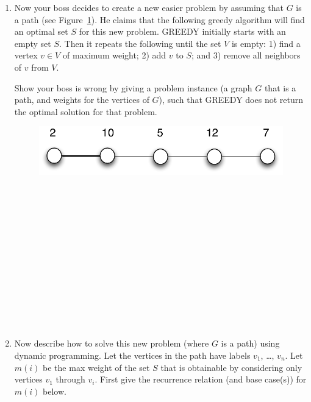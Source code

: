 \documentclass[11pt]{article}
\newcommand{\ans}[1]{}
\begin{document}
\begin{enumerate}
\begin{enumerate}
\pagebreak

\item Now your boss decides to create a new easier problem by assuming that $G$ is a path (see Figure~\ref{f:path}).  He claims that the following greedy algorithm will find an optimal set $S$ for this new problem.  GREEDY initially starts with an empty set $S$.  Then it repeats the following until the set $V$ is empty: 1) find a vertex $v \in V$ of maximum weight; 2) add $v$ to $S$; and 3) remove all neighbors of $v$ from $V$.

Show your boss is wrong by giving a problem instance (a graph $G$ that is a path, and weights for the vertices of $G$), such that GREEDY does not return the optimal solution for that problem.

\begin{figure}[h]
\begin{center}
\includegraphics[scale=0.4]{path.pdf} 
\caption{}
\label{f:path}
\end{center}
\end{figure}

\ans{Consider the graph $V = \{a,b,c\}$ where $E = \{ (a,b), (b,c) \}$ $w(a) = w(c) = 2$, $w(b) = 3$.  Greedy will always take the node $b$, but the optimal solution takes the nodes $a$ and $b$.} \ \\ \ \\ \ \\ \ \\ \ \\ \ \\ \ \\ \ \\ \ \\ \ \\ \ \\ \ \\


\pagebreak

\item Now describe how to solve this new problem (where $G$ is a path) using dynamic programming.  Let the vertices in the path have labels $v_{1}$, \ldots, $v_{n}$.   Let $m(i)$ be the max weight of the set $S$ that is obtainable by considering only vertices $v_{1}$ through $v_{i}$.  First give the recurrence relation (and base case(s)) for $m(i)$ below.


\end{enumerate}
\end{enumerate}
\end{document}
